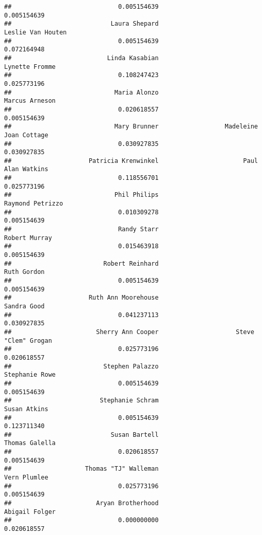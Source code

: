 \documentclass[
]{article}
\begin{document}
\begin{verbatim}
##                             0.005154639                             0.005154639 
##                           Laura Shepard                       Leslie Van Houten 
##                             0.005154639                             0.072164948 
##                          Linda Kasabian                          Lynette Fromme 
##                             0.108247423                             0.025773196 
##                            Maria Alonzo                          Marcus Arneson 
##                             0.020618557                             0.005154639 
##                            Mary Brunner                  Madeleine Joan Cottage 
##                             0.030927835                             0.030927835 
##                     Patricia Krenwinkel                       Paul Alan Watkins 
##                             0.118556701                             0.025773196 
##                            Phil Philips                        Raymond Petrizzo 
##                             0.010309278                             0.005154639 
##                             Randy Starr                           Robert Murray 
##                             0.015463918                             0.005154639 
##                         Robert Reinhard                             Ruth Gordon 
##                             0.005154639                             0.005154639 
##                     Ruth Ann Moorehouse                             Sandra Good 
##                             0.041237113                             0.030927835 
##                       Sherry Ann Cooper                     Steve "Clem" Grogan 
##                             0.025773196                             0.020618557 
##                         Stephen Palazzo                          Stephanie Rowe 
##                             0.005154639                             0.005154639 
##                        Stephanie Schram                            Susan Atkins 
##                             0.005154639                             0.123711340 
##                           Susan Bartell                          Thomas Galella 
##                             0.020618557                             0.005154639 
##                    Thomas "TJ" Walleman                            Vern Plumlee 
##                             0.025773196                             0.005154639 
##                       Aryan Brotherhood                          Abigail Folger 
##                             0.000000000                             0.020618557 

\end{verbatim}
\end{document}
